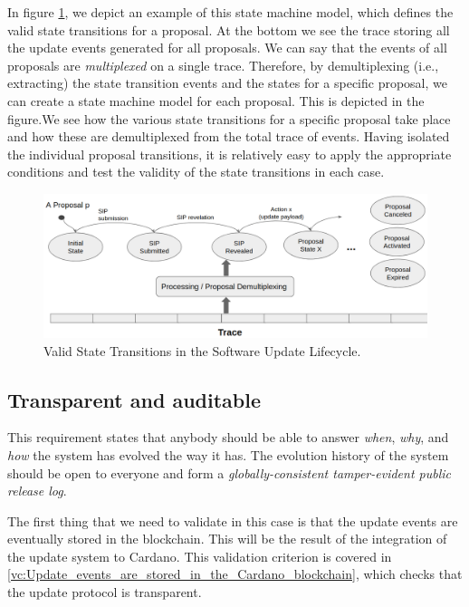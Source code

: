 In figure \ref{fig:state_transitions}, we depict an example of this state 
machine model, which defines the valid state transitions for a proposal. At the 
bottom we see the trace storing all the update events generated for all 
proposals. We can say that the events of all proposals are \emph{multiplexed} 
on a single trace. Therefore, by demultiplexing (i.e., extracting) the state 
transition events and the states for a specific proposal, we can create a state 
machine model for each proposal. This is depicted in the figure.We see 
how 
the various state transitions for a specific proposal take place and how these 
are demultiplexed from 
the total trace of events. Having isolated the individual proposal transitions, 
it is relatively easy to apply the 
appropriate conditions and test the validity of the state transitions in each 
case.

\begin{figure}[h!] %
	\centering
	\includegraphics[width=0.8\columnwidth,
	keepaspectratio]{figures/state_transitions.png}
	\caption{Valid State Transitions in the Software Update Lifecycle.}
	\label{fig:state_transitions}
\end{figure}

\subsection{Transparent and auditable}\label{sec:transp_auditable}
This requirement states that anybody should be able to answer \emph{when},
\emph{why}, and \emph{how} the system has
evolved the way it has. The evolution history of the system should be open to
everyone and form a \emph{globally-consistent tamper-evident public release
	log}.

The first thing that we need to validate in this case is that the update events
are eventually stored in the blockchain. This will be the result of the
integration of the update system to Cardano. This validation criterion is
covered in
\ref{vc:Update_events_are_stored_in_the_Cardano_blockchain}, which checks
that the update protocol is transparent.

